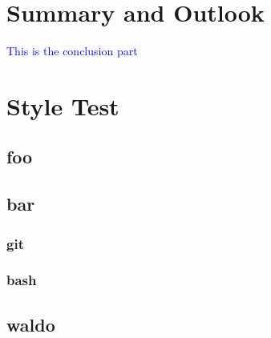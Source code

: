 \documentclass[parskip=half, titlepage=yes, 12pt, BCOR=12mm, DIV=calc]{scrartcl}
\begin{document}

\section{Summary and Outlook}

\textcolor{blue}
{
This is the conclusion part
}

\newpage


\section{Style Test}

\subsection{foo}

\blindtext


\subsection{bar}

\subsubsection{git}

\subsubsection{bash}

\subsection{waldo}

\Blindtext


\clearpage
\nocite{*}
\printbibliography

\newpage

\appendix

 
\end{document}
